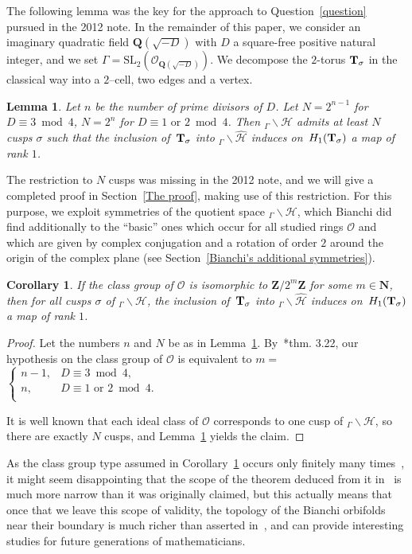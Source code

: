 \documentclass[twoside,a4paper,12 pt]{amsart}
\newcommand{\ringO}{\mathcal{O}}
\newcommand{\Hy}{\mathcal{H}}
\newcommand{\Z}{{\mathbf{Z}}}
\newcommand{\N}{{\mathbf{N}}}
\newcommand{\T}{{\bf{T}}}
\newcommand{\rationals}{{\mathbf{Q}}}
\theoremstyle{plain}
\newtheorem{lemma}[theorem]{Lemma}
\newtheorem{corollary}[theorem]{Corollary}
\theoremstyle{definition}
\theoremstyle{remark}
\begin{document}
\medskip

The following lemma was the key for the approach to Question~\ref{question} pursued in the 2012 note. 
In the remainder of this paper, we consider an imaginary quadratic field $\rationals(\sqrt{-D})$ 
with $D$ a square-free positive natural integer, and we set $\Gamma = \mathrm{SL_2}(\ringO_{\rationals(\sqrt{-D})})$.
We decompose the $2$-torus $\T_\sigma$ in the classical way into a $2$--cell, two edges and a vertex.

\begin{lemma} \label{torus-lemma}
Let $n$ be the number of prime divisors of $D$. Let $N = 2^{n-1}$ for $D \equiv 3 \bmod 4$, $N = 2^{n}$ for $D \equiv 1\text{ or } 2 \bmod 4$. 
Then $_\Gamma \backslash \Hy$ admits at least $N$ cusps $\sigma$ such that the inclusion of~$\T_\sigma$ into $_\Gamma \backslash \widehat{\Hy}$ 
induces on~$H_1(\T_\sigma)$ a map of rank $1$.
\end{lemma}

The restriction to $N$ cusps was missing in the 2012 note, and we will give a completed proof in Section~\ref{The proof}, making use of this restriction.
For this purpose, we exploit symmetries of the quotient space $_\Gamma \backslash \Hy$, 
which Bianchi did find additionally to the ``basic'' ones which occur for all studied rings $\ringO$ 
and which are given by complex conjugation and a rotation of order $2$ around the origin of the complex plane (see Section~\ref{Bianchi's additional symmetries}). 

\begin{corollary} \label{exponent 2 case}
 If the class group of $\ringO$ is isomorphic to $\Z/2^m\Z$ for some $m \in \N$, then for all cusps $\sigma$ of $_\Gamma \backslash \Hy$,
 the inclusion of~$\T_\sigma$ into $_\Gamma \backslash \widehat{\Hy}$ 
induces on~$H_1(\T_\sigma)$ a map of rank $1$.
\end{corollary}
\begin{proof}
Let the numbers $n$ and $N$ be as in Lemma~\ref{torus-lemma}.
By~\cite{Cox}*{thm. 3.22}, our hypothesis on the class group of $\ringO$ is equivalent to $m = $\scriptsize $\begin{cases}
        n-1, & D \equiv 3 \bmod 4,\\
        n,& D \equiv 1 \text{ or } 2 \bmod 4.\\
       \end{cases}$\normalsize

 It is well known that each ideal class of $\ringO$ corresponds to one cusp of $_\Gamma \backslash \Hy$, so there are exactly $N$ cusps, 
 and Lemma~\ref{torus-lemma} yields the claim.
 \end{proof}
As the class group type assumed in Corollary~\ref{exponent 2 case} occurs only finitely many times~\cite{Weinberger},
it might seem disappointing that the scope of the theorem deduced from it in~\cite{questionOfSerre}
is much more narrow than it was originally claimed,
but this actually means that once that we leave this scope of validity, the topology of the Bianchi orbifolds near their boundary is much richer than asserted in~\cite{questionOfSerre},
and can provide interesting studies for future generations of mathematicians.
\end{document}
